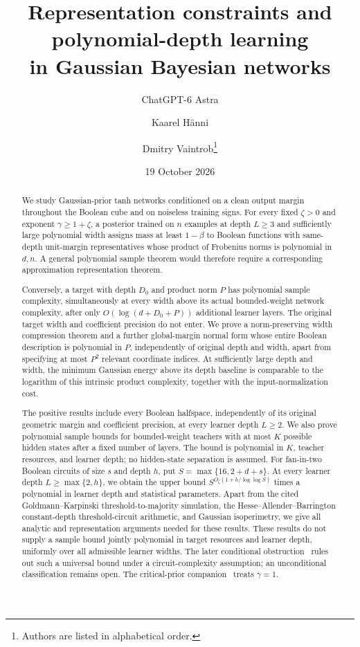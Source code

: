 \documentclass[11pt]{article}
\title{Representation constraints and polynomial-depth learning\\
in Gaussian Bayesian networks}
\author{ChatGPT-6 Astra \and Kaarel H\"anni \and Dmitry Vaintrob\thanks{Authors are listed in alphabetical order.}}
\date{19 October 2026}
\begin{document}
\maketitle
\begin{abstract}
We study Gaussian-prior tanh networks conditioned on a clean output
margin throughout the Boolean cube and on noiseless training signs.
For every fixed $\zeta>0$ and exponent $\gamma\ge1+\zeta$, a
posterior trained on $n$ examples at depth $L\ge3$ and sufficiently
large polynomial width assigns mass at least $1-\beta$ to Boolean
functions with same-depth unit-margin representatives whose product
of Frobenius norms is polynomial in $d,n$. A general polynomial
sample theorem would therefore require a corresponding approximation
representation theorem.

Conversely, a target with depth $D_0$ and product norm $P$ has
polynomial sample complexity, simultaneously at every width above
its actual bounded-weight network complexity, after only
$O(\log(d+D_0+P))$ additional learner layers. The original target
width and coefficient precision do not enter. We prove a
norm-preserving width compression theorem and a further global-margin
normal form whose entire Boolean description is polynomial in $P$,
independently of original depth and width, apart from specifying at
most $P^2$ relevant coordinate indices. At sufficiently large depth
and width, the minimum Gaussian energy above its depth baseline is
comparable to the logarithm of this intrinsic product complexity,
together with the input-normalization cost.

The positive results include every Boolean halfspace, independently
of its original geometric margin and coefficient precision, at every
learner depth $L\ge2$. We also prove polynomial sample bounds for
bounded-weight teachers with at most $K$ possible hidden states after
a fixed number of layers. The bound is polynomial in $K$, teacher
resources, and learner depth; no hidden-state separation is assumed.
For fan-in-two Boolean circuits of size $s$
and depth $h$, put $S=\max\{16,2+d+s\}$. At every learner depth
$L\ge\max\{2,h\}$, we obtain the upper bound
$S^{O_\zeta(1+h/\log\log S)}$ times a polynomial in learner depth and
statistical parameters. Apart from the cited Goldmann--Karpinski
threshold-to-majority simulation, the Hesse--Allender--Barrington
constant-depth threshold-circuit arithmetic, and Gaussian isoperimetry, we
give all analytic and representation arguments needed for these results.
These results do not supply a sample bound jointly polynomial in target
resources and learner depth, uniformly over all admissible learner widths.
The later conditional obstruction~\cite{conditional2026} rules out such a
universal bound under a circuit-complexity assumption; an unconditional
classification remains open. The critical-prior companion~\cite{critical2026}
treats $\gamma=1$.
\end{abstract}
\end{document}
